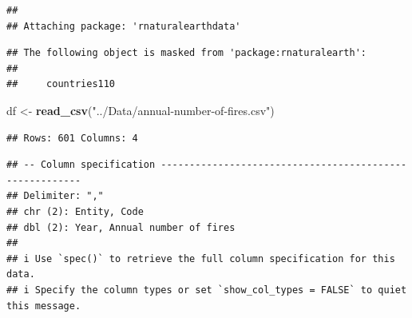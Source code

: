 \documentclass[
]{article}
\newenvironment{Shaded}{\begin{snugshade}}{\end{snugshade}}
\newcommand{\FunctionTok}[1]{\textcolor[rgb]{0.13,0.29,0.53}{\textbf{#1}}}
\newcommand{\NormalTok}[1]{#1}
\newcommand{\OtherTok}[1]{\textcolor[rgb]{0.56,0.35,0.01}{#1}}
\newcommand{\StringTok}[1]{\textcolor[rgb]{0.31,0.60,0.02}{#1}}
\begin{document}
\begin{verbatim}
## 
## Attaching package: 'rnaturalearthdata'
\end{verbatim}

\begin{verbatim}
## The following object is masked from 'package:rnaturalearth':
## 
##     countries110
\end{verbatim}

\begin{Shaded}
\begin{Highlighting}[]
\NormalTok{df }\OtherTok{\textless{}{-}} \FunctionTok{read\_csv}\NormalTok{(}\StringTok{"../Data/annual{-}number{-}of{-}fires.csv"}\NormalTok{)}
\end{Highlighting}
\end{Shaded}

\begin{verbatim}
## Rows: 601 Columns: 4
\end{verbatim}

\begin{verbatim}
## -- Column specification --------------------------------------------------------
## Delimiter: ","
## chr (2): Entity, Code
## dbl (2): Year, Annual number of fires
## 
## i Use `spec()` to retrieve the full column specification for this data.
## i Specify the column types or set `show_col_types = FALSE` to quiet this message.
\end{verbatim}
\end{document}
